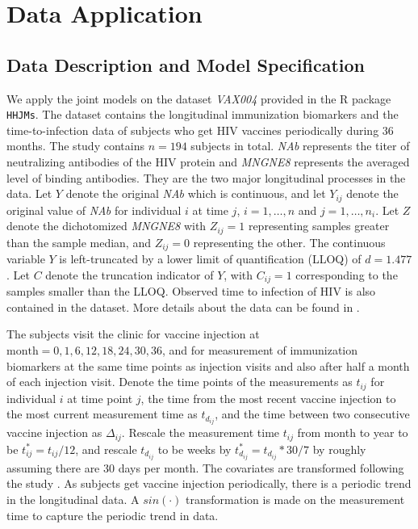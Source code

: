 \section{Data Application}
\label{sec:applc}

\subsection{Data Description and Model Specification}

We apply the joint models on the dataset \textit{VAX004} provided in the R package \texttt{HHJMs}.
The dataset contains the longitudinal immunization biomarkers and the time-to-infection data of subjects who get HIV vaccines periodically during $36$ months. The study contains $n=194$ subjects in total. \textit{NAb} represents the titer of neutralizing antibodies of the HIV protein and \textit{MNGNE8} represents the averaged level of binding  antibodies. They are the two major longitudinal processes in the data. Let $Y$ denote the original \textit{NAb} which is continuous, and let $Y_{ij}$ denote the original value of \textit{NAb} for individual $i$ at time $j$, $i=1,\dots,n$ and $j=1,\dots,n_i$. Let $Z$ denote the dichotomized \textit{MNGNE8} with $Z_{ij}=1$ representing samples greater than the sample median, and $Z_{ij}=0$ representing the other. The continuous variable $Y$ is left-truncated by a lower limit of quantification (LLOQ) of $d=1.477$. Let $C$ denote the truncation indicator of $Y$, with $C_{ij}=1$ corresponding to the samples smaller than the LLOQ. Observed time to infection of HIV is also contained in the dataset. More details about the data can be found in \cite{yu2018joint}.

The subjects visit the clinic for vaccine injection at $\text{month}=0,1,6,12,18,24,30,36$, and for measurement of immunization biomarkers at the same time points as injection visits and also after half a month of each injection visit. Denote the time points of the measurements as $t_{ij}$ for individual $i$ at time point $j$, the time from the most recent vaccine injection to the most current measurement time as $t_{d_{ij}}$, and the time between two consecutive vaccine injection as $\Delta_{ij}$. Rescale the measurement time $t_{ij}$ from month to year to be $t_{ij}^{\ast}=t_{ij}/12$, and rescale $t_{d_{ij}}$ to be weeks by $t_{d_{ij}}^{\ast}=t_{d_{ij}}*30/7$ by roughly assuming there are 30 days per month.
The covariates are transformed following the study \cite{yu2018joint}. As subjects get vaccine injection periodically, there is a periodic trend in the longitudinal data. A $sin(\cdot)$ transformation is made on the measurement time to capture the periodic trend in data. 
%

